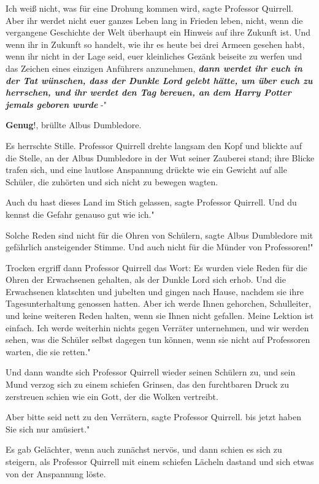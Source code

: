 \glqq{}Ich weiß nicht, was für eine Drohung kommen wird\grqq{}, sagte Professor
Quirrell. \glqq{}Aber ihr werdet nicht euer ganzes Leben lang in Frieden leben,
nicht, wenn die vergangene Geschichte der Welt überhaupt ein Hinweis auf ihre
Zukunft ist. Und wenn ihr in Zukunft so handelt, wie ihr es heute bei drei
Armeen gesehen habt, wenn ihr nicht in der Lage seid, euer kleinliches Gezänk
beiseite zu werfen und das Zeichen eines einzigen Anführers anzunehmen,
\textbf{\emph{dann werdet ihr euch in der Tat wünschen, dass der Dunkle Lord
gelebt hätte, um über euch zu herrschen, und ihr werdet den Tag bereuen, an dem
Harry Potter jemals geboren wurde} }-"

\glqq{}\textbf{Genug}!\grqq{}, brüllte Albus Dumbledore.

Es herrschte Stille. Professor Quirrell drehte langsam den Kopf und blickte auf
die Stelle, an der Albus Dumbledore in der Wut seiner Zauberei stand; ihre
Blicke trafen sich, und eine lautlose Anspannung drückte wie ein Gewicht auf
alle Schüler, die zuhörten und sich nicht zu bewegen wagten.

\glqq{}Auch du hast dieses Land im Stich gelassen\grqq{}, sagte Professor
Quirrell. \glqq{}Und du kennst die Gefahr genauso gut wie ich."

\glqq{}Solche Reden sind nicht für die Ohren von Schülern\grqq{}, sagte Albus
Dumbledore mit gefährlich ansteigender Stimme. \glqq{}Und auch nicht für die
Münder von Professoren!"

Trocken ergriff dann Professor Quirrell das Wort: \glqq{}Es wurden viele Reden
für die Ohren der Erwachsenen gehalten, als der Dunkle Lord sich erhob. Und die
Erwachsenen klatschten und jubelten und gingen nach Hause, nachdem sie ihre
Tagesunterhaltung genossen hatten. Aber ich werde Ihnen gehorchen, Schulleiter,
und keine weiteren Reden halten, wenn sie Ihnen nicht gefallen. Meine Lektion
ist einfach. Ich werde weiterhin nichts gegen Verräter unternehmen, und wir
werden sehen, was die Schüler selbst dagegen tun können, wenn sie nicht auf
Professoren warten, die sie retten."

Und dann wandte sich Professor Quirrell wieder seinen Schülern zu, und sein Mund
verzog sich zu einem schiefen Grinsen, das den furchtbaren Druck zu zerstreuen
schien wie ein Gott, der die Wolken vertreibt.

\glqq{}Aber bitte seid nett zu den Verrätern\grqq{}, sagte Professor Quirrell.
\glqq{}bis jetzt haben Sie sich nur amüsiert."

Es gab Gelächter, wenn auch zunächst nervös, und dann schien es sich zu
steigern, als Professor Quirrell mit einem schiefen Lächeln dastand und sich
etwas von der Anspannung löste.


